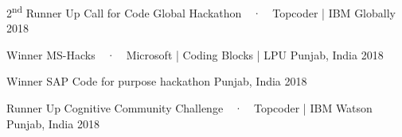 
\vspace{-0.3cm}



\begin{cvhonors}


  \cvhonor
  {2\textsuperscript{nd} Runner Up} %
  {Call for Code Global Hackathon~~·~~Topcoder | IBM} %
  {Globally} %
  {2018} %

  \cvhonor
  {Winner}
  {MS-Hacks~~·~~Microsoft | Coding Blocks | LPU}
  {Punjab, India}
  {2018}

  \cvhonor
  {Winner} %
  {SAP Code for purpose hackathon} %
  {Punjab, India} %
  {2018} %


  \cvhonor
  {Runner Up} %
  {Cognitive Community Challenge~~·~~Topcoder | IBM Watson} %
  {Punjab, India} %
  {2018} %


\end{cvhonors}

